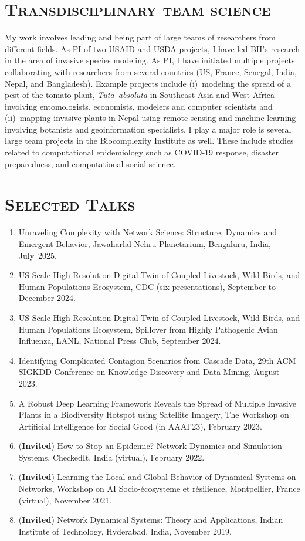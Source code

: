 \documentclass[margin,10pt]{res} %
\newcommand{\tutafull}{\emph{Tuta~absoluta}}
\begin{document}
\begin{resume}
{\section{\textnormal{\textsc{Transdisciplinary team science}}}
My work involves leading and being part of large teams of researchers from
different fields.  As PI of two USAID and USDA projects, I have led BII’s
research in the area of invasive species modeling. As PI, I have initiated
multiple projects collaborating with researchers from several countries
(US, France, Senegal, India, Nepal, and Bangladesh). Example projects
include (i)~modeling the spread of a pest of the tomato plant, \tutafull{} in
Southeast Asia and West Africa involving entomologists, economists,
modelers and computer scientists and (ii)~mapping invasive plants in Nepal
using remote-sensing and machine learning involving botanists and
geoinformation specialists. I play a major role is several large team projects in the
Biocomplexity Institute as well. These include studies related to
computational epidemiology such as COVID-19 response, disaster
preparedness, and computational social science.

\section{\textnormal{\textsc{Selected Talks}}} 
\begin{enumerate}[1.]
\item Unraveling Complexity with Network Science: Structure, Dynamics and
Emergent Behavior, Jawaharlal Nehru Planetarium, Bengaluru, India, July~2025.
\item US-Scale High Resolution Digital Twin of Coupled Livestock, Wild
Birds, and Human Populations Ecosystem, CDC (six presentations), September
to December 2024.
\item US-Scale High Resolution Digital Twin of Coupled Livestock, Wild
Birds, and Human Populations Ecosystem, Spillover from Highly Pathogenic
Avian Influenza, LANL, National Press Club, September 2024.
\item Identifying Complicated Contagion Scenarios from Cascade Data, 29th
ACM SIGKDD Conference on Knowledge Discovery and Data Mining, August
2023.
\item A Robust Deep Learning Framework Reveals the Spread of Multiple
Invasive Plants in a Biodiversity Hotspot using Satellite Imagery, The
Workshop on Artificial Intelligence for Social Good (in AAAI'23), February
2023.
\item (\textbf{Invited}) How to Stop an Epidemic? Network Dynamics and Simulation Systems,
CheckedIt, India (virtual), February 2022.
\item (\textbf{Invited}) Learning the Local and Global Behavior of
Dynamical Systems on Networks, Workshop on AI Socio-\'{e}cosysteme et
r\'{e}silience, Montpellier, France (virtual), November 2021.
\item (\textbf{Invited}) Network Dynamical Systems: Theory and
Applications, Indian Institute of Technology, Hyderabad, India,
November 2019.
\end{enumerate}

}
\end{resume}
\end{document}
